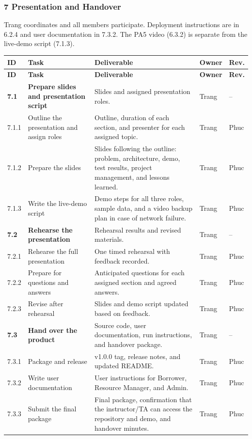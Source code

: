 \documentclass[11pt]{article}
\renewcommand{\arraystretch}{1.18}
\begin{document}
\subsubsection*{7 Presentation and Handover}
Trang coordinates and all members participate. Deployment instructions are in 6.2.4 and user documentation in 7.3.2. The PA5 video (6.3.2) is separate from the live-demo script (7.1.3).
\footnotesize\setlength{\tabcolsep}{2.5pt}\renewcommand{\arraystretch}{1.08}
\begin{longtable}{@{}L{1.15cm}L{3.2cm}L{7.6cm}L{1.4cm}L{1.4cm}@{}}
\toprule
\textbf{ID} & \textbf{Task} & \textbf{Deliverable} & \textbf{Owner} & \textbf{Rev.} \\
\midrule\endfirsthead\toprule
\textbf{ID} & \textbf{Task} & \textbf{Deliverable} & \textbf{Owner} & \textbf{Rev.} \\
\midrule\endhead
\textbf{7.1} & \textbf{Prepare slides and presentation script} & Slides and assigned presentation roles. & Trang & -- \\
7.1.1 & Outline the presentation and assign roles & Outline, duration of each section, and presenter for each assigned topic. & Trang & Phuc \\
7.1.2 & Prepare the slides & Slides following the outline: problem, architecture, demo, test results, project management, and lessons learned. & Trang & Phuc \\
7.1.3 & Write the live-demo script & Demo steps for all three roles, sample data, and a video backup plan in case of network failure. & Trang & Phuc \\
\textbf{7.2} & \textbf{Rehearse the presentation} & Rehearsal results and revised materials. & Trang & -- \\
7.2.1 & Rehearse the full presentation & One timed rehearsal with feedback recorded. & Trang & Phuc \\
7.2.2 & Prepare for questions and answers & Anticipated questions for each assigned section and agreed answers. & Trang & Phuc \\
7.2.3 & Revise after rehearsal & Slides and demo script updated based on feedback. & Trang & Phuc \\
\textbf{7.3} & \textbf{Hand over the product} & Source code, user documentation, run instructions, and handover package. & Trang & -- \\
7.3.1 & Package and release & v1.0.0 tag, release notes, and updated README. & Trang & Phuc \\
7.3.2 & Write user documentation & User instructions for Borrower, Resource Manager, and Admin. & Trang & Phuc \\
7.3.3 & Submit the final package & Final package, confirmation that the instructor/TA can access the repository and demo, and handover minutes. & Trang & Phuc \\
\bottomrule\end{longtable}\normalsize\setlength{\tabcolsep}{3pt}\renewcommand{\arraystretch}{1.18}
\end{document}
